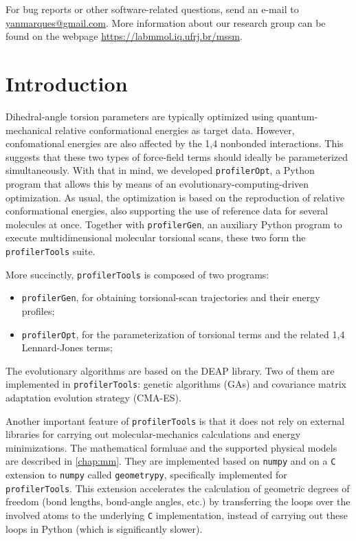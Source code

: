 \documentclass[10pt,a4paper,openany]{memoir}
\numberwithin{equation}{section}
\newcommand{\profileropt}[0]{\texttt{profilerOpt}}
\newcommand{\profilergen}[0]{\texttt{profilerGen}}
\newcommand{\profilertools}[0]{\texttt{profilerTools}}
\begin{document}
  For bug reports or other software-related questions, send an e-mail
  to \url{yanmarques@gmail.com}.  More information about our research
  group can be found on the webpage
  \url{https://labmmol.iq.ufrj.br/mssm}.

\tableofcontents

  \mainmatter

\newcommand*{\profi}{\texttt{profilerOpt}}

\chapter{Introduction}
\label{chap:intro}

Dihedral-angle torsion parameters are typically optimized using
quantum-mechanical relative conformational energies as target data.
%
However, confomational energies are also affected by the 1,4 nonbonded
interactions.
%
This suggests that these two types of force-field terms should ideally
be parameterized simultaneously.
%
With that in mind, we developed \profileropt{}, a Python program that
allows this by means of an evolutionary-computing-driven
optimization.
%
As usual, the optimization is based on the reproduction of relative
conformational energies, also supporting the use of reference data for
several molecules at once.
%
Together with \profilergen{}, an auxiliary Python program to execute
multidimensional molecular torsional scans, these two form the
\profilertools{} suite.
%

More succinctly, \profilertools{} is composed of two programs:

\begin{itemize}
\item \profilergen, for obtaining torsional-scan trajectories and
  their energy profiles;
\item \profileropt, for the parameterization of torsional terms and
  the related 1,4 Lennard-Jones terms;
\end{itemize}

The evolutionary algorithms are based on the DEAP library\cite{DEAP}.
Two of them are implemented in \profilertools{}: genetic algorithms
(GAs) and covariance matrix adaptation evolution strategy (CMA-ES).

Another important feature of \profilertools{} is that it does not rely
on external libraries for carrying out molecular-mechanics
calculations and energy minimizations. The mathematical formluae and
the supported physical models are described in \autoref{chap:mm}. They
are implemented based on \texttt{numpy} and on a \texttt{C} extension
to \texttt{numpy} called \texttt{geometrypy}, specifically implemented
for \profilertools. This extension accelerates the calculation of
geometric degrees of freedom (bond lengths, bond-angle angles, etc.)
by transferring the loops over the involved atoms to the underlying
\texttt{C} implementation, instead of carrying out these loops in
Python (which is significantly slower).
\end{document}
